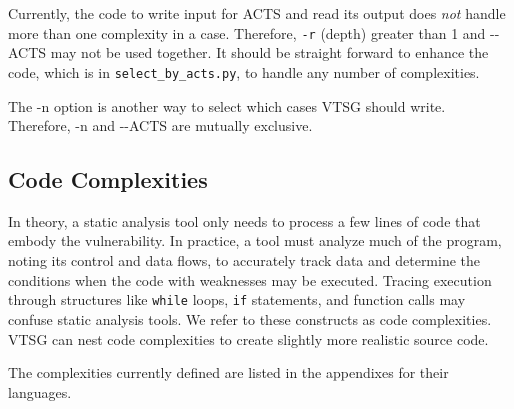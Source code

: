 Currently, the code to write input for ACTS and read its output does \emph{not}
handle more than one complexity in a case.  Therefore, \verb|-r| (depth) greater
than 1 and
-\zws-ACTS may not be used together.  It should be straight forward to enhance
the code, which is in \verb|select_by_acts.py|, to handle any number of
complexities.

The -n option is another way to select which cases VTSG should write.
Therefore, -n and -\zws-ACTS are mutually exclusive.

\subsection{Code Complexities}
\label{sec:code complexities}

In theory, a static analysis tool only needs to process a few lines of
code that
embody the vulnerability. In practice, a tool must analyze much
of the program,
noting its control and data flows, to accurately track data and
determine the
conditions when the code with weaknesses may be executed.
Tracing execution through structures like \verb|while| loops, \verb|if|
statements, and function calls may confuse static analysis tools.
We refer to these constructs as code complexities.
VTSG can nest code complexities to create slightly more realistic source code.

The complexities currently defined
are listed in the appendixes for their languages.

